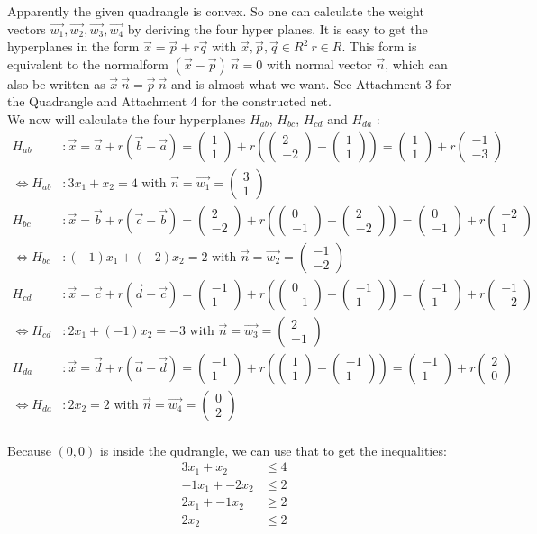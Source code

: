 \documentclass{scrartcl}
\newcommand*\colvec[2]{
        \begin{pmatrix} #1 \\ #2 \end{pmatrix}
}
\begin{document}
Apparently the given quadrangle is convex. So one can calculate the weight vectors $\vec{w_1},\vec{w_2},\vec{w_3},\vec{w_4}$ by deriving the four hyper planes.
It is easy to get the hyperplanes in the form $\vec{x} = \vec{p} + r \vec{q}$ with $\vec{x},\vec{p},\vec{q} \in R^2 ~r \in R$. This form is equivalent to the normalform $(\vec{x}-\vec{p})~\vec{n} = 0$ with normal vector $\vec{n}$, which can also be written as $\vec{x} ~ \vec{n} = \vec{p} ~ \vec{n}$ and is almost what we want. See Attachment 3 for the Quadrangle and Attachment 4 for the constructed net.\\
We now will calculate the four hyperplanes $H_{ab}$, $H_{bc}$, $H_{cd}$ and $H_{da}$ : \\
\begin{align*}
H_{ab}&: \vec{x} = \vec{a} + r (\vec{b}-\vec{a}) = \colvec{1}{1} + r \left(\colvec{2}{-2} - \colvec{1}{1}\right) = \colvec{1}{1} + r \colvec{-1}{-3} \\
\Leftrightarrow H_{ab}&: 3x_1 + x_2 = 4 \text{~with~} \vec{n} = \vec{w_1} = \colvec{3}{1} \\
H_{bc}&: \vec{x} = \vec{b} + r (\vec{c}-\vec{b}) = \colvec{2}{-2} + r \left(\colvec{0}{-1} - \colvec{2}{-2}\right) = \colvec{0}{-1} + r \colvec{-2}{1} \\
\Leftrightarrow H_{bc}&: (-1) x_1 + (-2) x_2 = 2 \text{~with~} \vec{n} = \vec{w_2} = \colvec{-1}{-2}\\
H_{cd}&: \vec{x} = \vec{c} + r (\vec{d}-\vec{c}) = \colvec{-1}{1} + r \left(\colvec{0}{-1} - \colvec{-1}{1}\right) = \colvec{-1}{1} + r \colvec{-1}{-2} \\
\Leftrightarrow H_{cd}&: 2 x_1 + (-1) x_2 = -3 \text{~with~} \vec{n} = \vec{w_3} = \colvec{2}{-1}\\
H_{da}&: \vec{x} = \vec{d} + r (\vec{a}-\vec{d}) = \colvec{-1}{1} + r \left(\colvec{1}{1} - \colvec{-1}{1}\right) = \colvec{-1}{1} + r \colvec{2}{0} \\
\Leftrightarrow H_{da}&: 2 x_2 = 2 \text{~with~} \vec{n} = \vec{w_4} = \colvec{0}{2}\\
\end{align*}

Because $(0,0)$ is inside the qudrangle, we can use that to get the inequalities:
\begin{align*}
3 x_1 + x_2 &\le 4 \\
-1 x_1 + -2 x_2 &\le 2 \\
2 x_1 + -1 x_2 &\ge 2 \\
2 x_2 &\le 2 \\
\end{align*}
\end{document}
